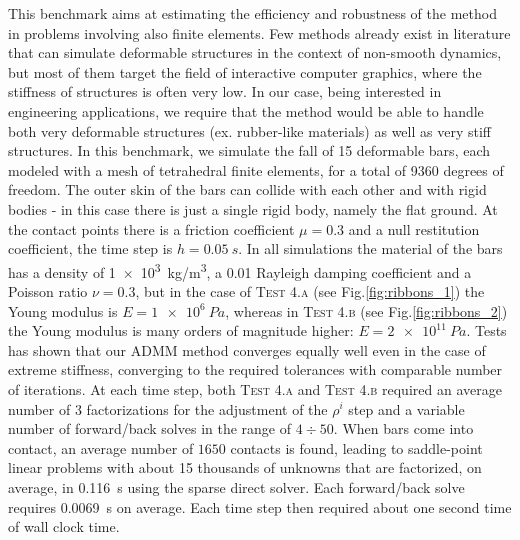 \documentclass[final,3p]{elsarticle}
\begin{document}
This benchmark aims at estimating the efficiency and robustness of the method in problems involving also finite elements. Few methods already exist in literature that can simulate deformable structures in the context of non-smooth dynamics, but most of them target the field of interactive computer graphics, where the stiffness of structures is often very low. In our case, being interested in engineering applications, we require that the method would be able to handle both very deformable structures (ex. rubber-like materials) as well as very stiff structures. In this benchmark, we simulate the fall of 15 deformable bars, each modeled with a mesh of tetrahedral finite elements, for a total of 9360 degrees of freedom. The outer skin of the bars can collide with each other and with rigid bodies - in this case there is just a single rigid body, namely the flat ground. At the contact points there is a friction coefficient $\mu=0.3$ and a null restitution coefficient, the time step is $h=\SI{0.05}{s}$. In all simulations the material of the bars has a density of \SI{1e3}{kg/m^3}, a 0.01 Rayleigh damping coefficient and a Poisson ratio $\nu=0.3$, but in the case of \textsc{Test 4.a} (see Fig.\ref{fig:ribbons_1}) the Young modulus is $E=\SI{1e6}{Pa}$, whereas in \textsc{Test 4.b} (see Fig.\ref{fig:ribbons_2}) the Young modulus is many orders of magnitude higher: $E=\SI{2e11}{Pa}$. Tests has shown that our ADMM method converges equally well even in the case of extreme stiffness, converging to the required  tolerances with comparable number of iterations. At each time step, both \textsc{Test 4.a} and \textsc{Test 4.b} required an average number of 3 factorizations for the adjustment of the $\rho^i$ step and a variable number of forward/back solves in the range of $4\div50$. When bars come into contact, an average number of $1650$ contacts is found, leading to saddle-point linear problems with about 15 thousands of unknowns that are factorized, on average, in \SI{0.116}{s} using the sparse direct solver. Each forward/back solve requires \SI{0.0069}{s} on average. Each time step then required about one second time of wall clock time.
\end{document}
